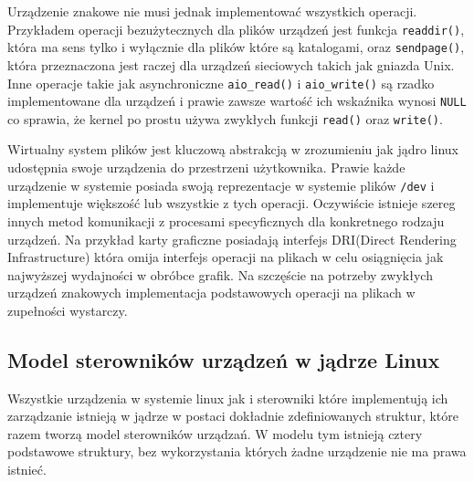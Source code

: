 \documentclass[10pt]{scrartcl}
\begin{document}
Urządzenie znakowe nie musi jednak implementować wszystkich operacji.  Przykładem operacji bezużytecznych dla plików urządzeń jest funkcja \texttt{readdir()}, która ma sens tylko i wyłącznie dla plików które są katalogami, oraz \texttt{sendpage()}, która przeznaczona jest raczej dla urządzeń sieciowych takich jak gniazda Unix. Inne operacje takie jak asynchroniczne \texttt{aio\_read()} i \texttt{aio\_write()} są rzadko implementowane dla urządzeń i prawie zawsze wartość ich wskaźnika wynosi \texttt{NULL} co sprawia, że kernel po prostu używa zwykłych funkcji \texttt{read()} oraz \texttt{write()}.

Wirtualny system plików jest kluczową abstrakcją w zrozumieniu jak jądro linux udostępnia swoje urządzenia do przestrzeni użytkownika. Prawie każde urządzenie w systemie posiada swoją reprezentacje w systemie plików \texttt{/dev} i implementuje większość lub wszystkie z tych operacji. Oczywiście istnieje szereg innych metod komunikacji z procesami specyficznych dla konkretnego rodzaju urządzeń. Na przykład karty graficzne posiadają interfejs DRI(Direct Rendering Infrastructure) która omija interfejs operacji na plikach w celu osiągnięcia jak najwyższej wydajności w obróbce grafik. Na szczęście na potrzeby zwykłych urządzeń znakowych implementacja podstawowych operacji na plikach w zupełności wystarczy.

\subsection{Model sterowników urządzeń w jądrze Linux}
\label{linuxdrivermodel}

Wszystkie urządzenia w systemie linux jak i sterowniki które implementują ich zarządzanie istnieją w jądrze w postaci dokładnie zdefiniowanych struktur, które razem tworzą model sterowników urządzań.  W modelu tym istnieją cztery podstawowe struktury, bez wykorzystania których żadne urządzenie nie ma prawa istnieć.
\end{document}
